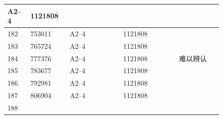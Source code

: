 \documentclass[UTF8,10pt,a4paper,fontset=fandol]{ctexart}
\newcommand{\fieldvalue}[1]{#1}
\newcommand{\handwritten}[1]{#1}
\begin{document}
\begin{tabular}{|p{0.07\linewidth}|p{0.16\linewidth}|p{0.22\linewidth}|p{0.23\linewidth}|p{0.18\linewidth}|}
\fieldvalue{A2--4} &
\fieldvalue{1121808} & \\
\hline
\fieldvalue{182} &
\fieldvalue{753011} &
\fieldvalue{A2--4} &
\fieldvalue{1121808} & \\
\hline
\fieldvalue{183} &
\fieldvalue{765724} &
\fieldvalue{A2--4} &
\fieldvalue{1121808} & \\
\hline
\fieldvalue{184} &
\fieldvalue{777376} &
\fieldvalue{A2--4} &
\fieldvalue{1121808} &
\fieldvalue{\handwritten{难以辨认}} \\
\hline
\fieldvalue{185} &
\fieldvalue{783677} &
\fieldvalue{A2--4} &
\fieldvalue{1121808} & \\
\hline
\fieldvalue{186} &
\fieldvalue{792981} &
\fieldvalue{A2--4} &
\fieldvalue{1121808} & \\
\hline
\fieldvalue{187} &
\fieldvalue{806904} &
\fieldvalue{A2--4} &
\fieldvalue{1121808} & \\
\hline
\fieldvalue{188} &

\end{tabular}
\end{document}
